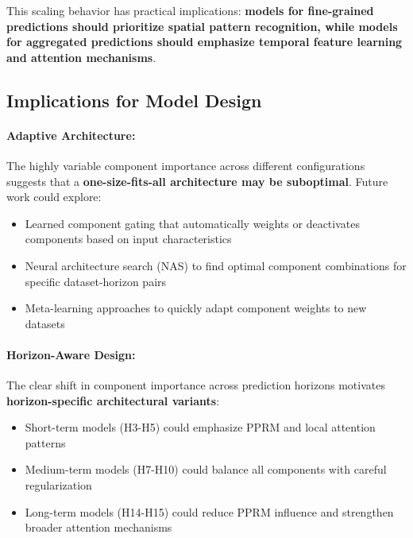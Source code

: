 \documentclass[11pt,a4paper]{article}
\begin{document}
This scaling behavior has practical implications: \textbf{models for fine-grained predictions should prioritize spatial pattern recognition, while models for aggregated predictions should emphasize temporal feature learning and attention mechanisms}.

\subsection{Implications for Model Design}

\paragraph{Adaptive Architecture:} The highly variable component importance across different configurations suggests that a \textbf{one-size-fits-all architecture may be suboptimal}. Future work could explore:

\begin{itemize}
    \item Learned component gating that automatically weights or deactivates components based on input characteristics
    \item Neural architecture search (NAS) to find optimal component combinations for specific dataset-horizon pairs
    \item Meta-learning approaches to quickly adapt component weights to new datasets
\end{itemize}

\paragraph{Horizon-Aware Design:} The clear shift in component importance across prediction horizons motivates \textbf{horizon-specific architectural variants}:

\begin{itemize}
    \item Short-term models (H3-H5) could emphasize PPRM and local attention patterns
    \item Medium-term models (H7-H10) could balance all components with careful regularization
    \item Long-term models (H14-H15) could reduce PPRM influence and strengthen broader attention mechanisms
\end{itemize}
\end{document}
